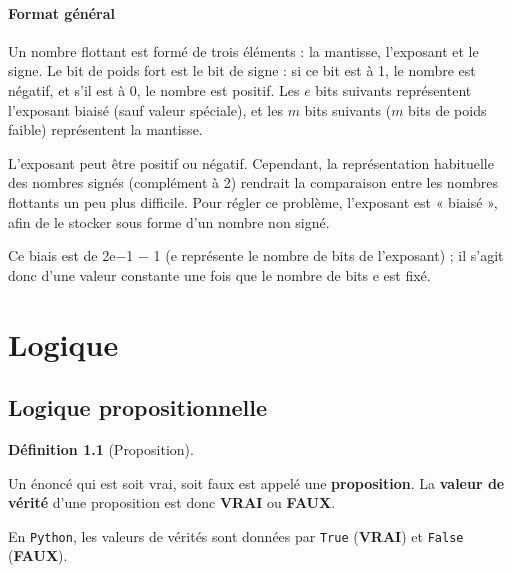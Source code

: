 \documentclass[
  letterpaper,
]{scrbook}
\theoremstyle{plain}
\theoremstyle{definition}
\theoremstyle{definition}
\newtheorem{definition}{Définition}[chapter]
\theoremstyle{remark}
\begin{document}
\hypertarget{format-guxe9nuxe9ral}{%
\subsubsection*{Format général}\label{format-guxe9nuxe9ral}}

Un nombre flottant est formé de trois éléments : la mantisse, l'exposant
et le signe. Le bit de poids fort est le bit de signe : si ce bit est à
1, le nombre est négatif, et s'il est à 0, le nombre est positif. Les
\(e\) bits suivants représentent l'exposant biaisé (sauf valeur
spéciale), et les \(m\) bits suivants (\(m\) bits de poids faible)
représentent la mantisse.

L'exposant peut être positif ou négatif. Cependant, la représentation
habituelle des nombres signés (complément à 2) rendrait la comparaison
entre les nombres flottants un peu plus difficile. Pour régler ce
problème, l'exposant est « biaisé », afin de le stocker sous forme d'un
nombre non signé.

Ce biais est de 2e−1 − 1 (e représente le nombre de bits de l'exposant)
; il s'agit donc d'une valeur constante une fois que le nombre de bits e
est fixé.


\hypertarget{logique}{%
\chapter{Logique}\label{logique}}

\hypertarget{logique-propositionnelle}{%
\section{Logique propositionnelle}\label{logique-propositionnelle}}

\leavevmode{}%
\begin{definition}[Proposition]\label{def-proposition}

Un énoncé qui est soit vrai, soit faux est appelé une
\textbf{proposition}. La \textbf{valeur de vérité} d'une proposition est
donc \textbf{VRAI} ou \textbf{FAUX}.

En \texttt{Python}, les valeurs de vérités sont données par
\texttt{True} (\textbf{VRAI}) et \texttt{False} (\textbf{FAUX}).

\end{definition}
\end{document}
